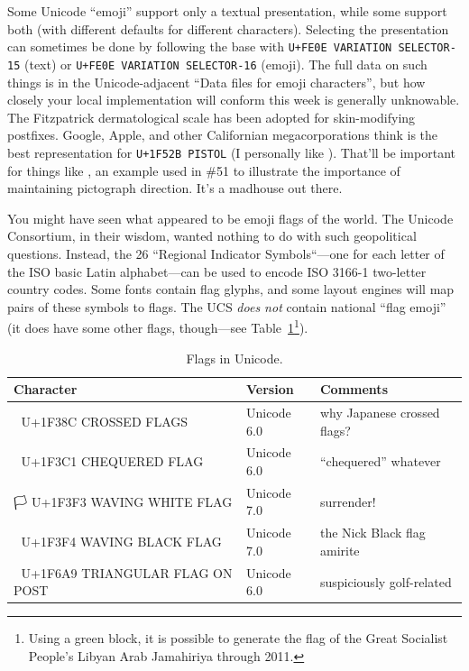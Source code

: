 Some Unicode ``emoji'' support only a textual presentation, while some
support both (with different defaults for different characters). Selecting
the presentation can sometimes be done by following the base with \texttt{U+FE0E VARIATION SELECTOR-15} (text)
or \texttt{U+FE0E VARIATION SELECTOR-16} (emoji). The full data on such things
is in the Unicode-adjacent ``Data files for emoji characters'', but how closely
your local implementation will conform this week is generally unknowable. The
Fitzpatrick dermatological scale has been adopted for skin-modifying postfixes.
Google, Apple, and other Californian megacorporations think
 is the best representation for
 \texttt{U+1F52B PISTOL} (I personally like
). That'll be important for things like
{}, an example used in \#51 to illustrate the
importance of maintaining pictograph direction. It's a madhouse out there.

You might have seen what appeared to be emoji flags of the world. The Unicode
Consortium, in their wisdom, wanted nothing to do with such geopolitical
questions. Instead, the 26 ``Regional Indicator Symbols``---one for each
letter of the ISO basic Latin alphabet\cite{iso646}---can be used to encode
ISO 3166-1\cite{iso3166} two-letter country codes\cite{darkcorners}. Some fonts contain flag
glyphs, and some layout engines will map pairs of these symbols to flags. The
UCS \textit{does not} contain national ``flag emoji'' (it does have some other
flags, though---see Table~\ref{table:flags}\footnote{Using a green block,
it is possible to generate the flag of the Great Socialist People's Libyan Arab Jamahiriya through 2011.}).

\begin{table}[!htb]
  \centering
  \begin{tabular}{|l|l|l|}
  \hline
  Character & Version & Comments \\
  \hline
  \hline
  🎌 U+1F38C CROSSED FLAGS & Unicode 6.0 & why Japanese crossed flags? \\
  \hline
  🏁 U+1F3C1 CHEQUERED FLAG & Unicode 6.0 & ``chequered'' whatever \\
  \hline
  🏳 U+1F3F3 WAVING WHITE FLAG & Unicode 7.0 & surrender! \\
  \hline
  🏴  U+1F3F4 WAVING BLACK FLAG & Unicode 7.0 & the Nick Black flag amirite \\
  \hline
  🚩 U+1F6A9 TRIANGULAR FLAG ON POST & Unicode 6.0 & suspiciously golf-related \\
  \hline
  \end{tabular}
  \caption{Flags in Unicode.}
  \label{table:flags}
\end{table}

